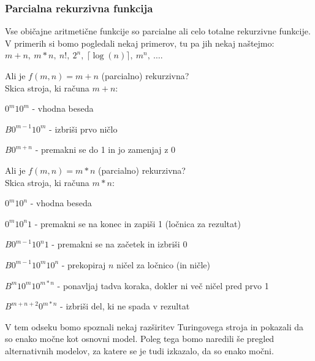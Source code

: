 \documentclass[10pt,a4paper,oneside]{book}
\begin{document}
\subsubsection{Parcialna rekurzivna funkcija}
Vse običajne aritmetične funkcije so parcialne ali celo totalne rekurzivne funkcije. V primerih si bomo pogledali nekaj primerov, tu pa jih nekaj naštejmo: $m+n,\ m*n,\ n!,\ 2^n,\ \lceil \log(n) \rceil,\ m^n,\ \dots$.
\begin{primeri}
\item
    Ali je $f(m,n)=m+n$ (parcialno) rekurzivna?\\
    Skica stroja, ki računa $m+n$:
    \begin{items}
    \item $0^m 1 0^m$ - vhodna beseda
    \item $B0^{m-1} 1 0^m$ - izbriši prvo ničlo
    \item $B0^{m+n}$ - premakni se do 1 in jo zamenjaj z 0
    \end{items}%
\item
    Ali je $f(m,n)=m*n$ (parcialno) rekurzivna?\\
    Skica stroja, ki računa $m*n$:
    \begin{items}
    \item $0^m 1 0^n$ - vhodna beseda
    \item $0^m 1 0^n 1$ - premakni se na konec in zapiši 1 (ločnica za rezultat)
    \item $B 0^{m-1} 1 0^n 1$ - premakni se na začetek in izbriši 0
    \item $B 0^{m-1} 1 0^m 1 0^n$ - prekopiraj $n$ ničel za ločnico (in ničle)
    \item $B^{m} 1 0^m 1 0^{m*n}$ - ponavljaj tadva koraka, dokler ni več ničel pred prvo 1
    \item $B^{m+n+2}0^{m*n}$ - izbriši del, ki ne spada v rezultat 
    \end{items}%
\end{primeri}

V tem odseku bomo spoznali nekaj razširitev Turingovega stroja in pokazali da so enako močne kot osnovni model. Poleg tega bomo naredili še pregled alternativnih modelov, za katere se je tudi izkazalo, da so enako močni.%
\end{document}
